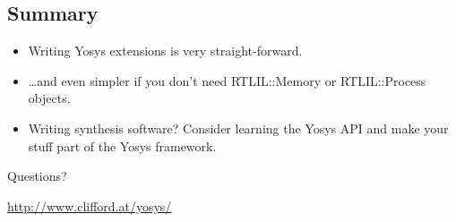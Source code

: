
\subsection{Summary}

\begin{frame}{\subsecname}
\begin{itemize}
\item Writing Yosys extensions is very straight-forward.
\item \dots and even simpler if you don't need RTLIL::Memory or RTLIL::Process objects.

\bigskip
\item Writing synthesis software? Consider learning the Yosys API and make your stuff
part of the Yosys framework.
\end{itemize}

\bigskip
\bigskip
\begin{center}
Questions?
\end{center}

\bigskip
\bigskip
\begin{center}
\url{http://www.clifford.at/yosys/}
\end{center}
\end{frame}

